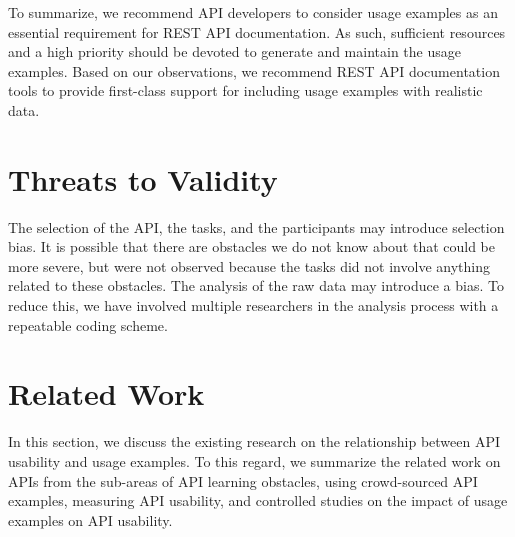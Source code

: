 \documentclass[conference]{IEEEtran}
\begin{document}
\vspace{1mm}
\hspace{-5mm}
\vspace{0.5mm}

To summarize, we recommend API developers to consider usage examples as an essential requirement for REST API documentation. As such, sufficient resources and a high priority should be devoted to generate and maintain the usage examples. Based on our observations, we recommend REST API documentation tools to provide first-class support for including usage examples with realistic data.

\section{Threats to Validity}
\label{sec:threat}
The selection of the API, the tasks, and the participants may introduce selection bias. It is possible that there are obstacles we do not know about that could be more severe, but were not observed because the tasks did not involve anything related to these obstacles. The analysis of the raw data may introduce a bias. To reduce this, we have involved multiple researchers in the analysis process with a repeatable coding scheme.

\section{Related Work}
\label{sec:related_work}

In this section, we discuss the existing research on the relationship between API usability and usage examples. To this regard, we summarize the related work on APIs from the sub-areas of API learning obstacles, using crowd-sourced API examples, measuring API usability, and controlled studies on the impact of usage examples on API usability.
\end{document}
